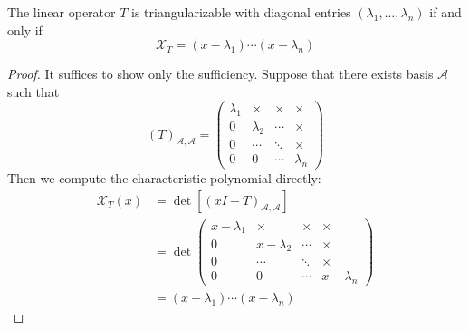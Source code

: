 \begin{theorem}
The linear operator $T$ is triangularizable with diagonal entries $(\lambda_1,\dots,\lambda_n)$ if and only if 
\[
\mathcal{X}_{T}=(x-\lambda_1)\cdots(x-\lambda_n)
\]
\end{theorem}
\begin{proof}
It suffices to show only the sufficiency.
Suppose that there exists basis $\mathcal{A}$ such that 
\[
(T)_{\mathcal{A},\mathcal{A}}=\begin{pmatrix}
\lambda_1&\times&\times&\times\\
0&\lambda_2&\cdots&\times\\
0&\cdots&\ddots&\times\\
0&0&\cdots&\lambda_n
\end{pmatrix}
\]
Then we compute the characteristic polynomial directly:
\begin{align*}
\mathcal{X}_T(x)&=\det[(xI-T)_{\mathcal{A},\mathcal{A}}]\\
&=\det\begin{pmatrix}
x-\lambda_1&\times&\times&\times\\
0&x-\lambda_2&\cdots&\times\\
0&\cdots&\ddots&\times\\
0&0&\cdots&x-\lambda_n
\end{pmatrix}\\
&=(x-\lambda_1)\cdots(x-\lambda_n)
\end{align*}
\end{proof}
